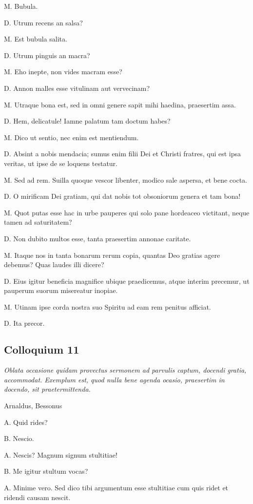 \documentclass{article}
\begin{document}
M. Bubula. 

D. Utrum recens an salsa?

M. Est bubula salita. 

D. Utrum pinguis an macra?

M. Eho inepte, non vides macram esse?

D. Annon malles esse vitulinam aut vervecinam?

M. Utraque bona est, sed in omni genere sapit mihi haedina, praesertim assa. 

D. Hem, delicatule! Iamne palatum tam doctum habes?

M. Dico ut sentio, nec enim est mentiendum. 

D. Absint a nobis mendacia; sumus enim filii Dei et Christi fratres, qui est ipsa veritas, ut ipse de se loquens testatur. 

M. Sed ad rem. Suilla quoque vescor libenter, modico sale aspersa, et bene cocta. 

D. O mirificam Dei gratiam, qui dat nobis tot obsoniorum genera et tam bona!

M. Quot putas esse hac in urbe pauperes qui solo pane hordeaceo victitant, neque tamen ad saturitatem?

D. Non dubito multos esse, tanta praesertim annonae caritate. 

M. Itaque nos in tanta bonarum rerum copia, quantas Deo gratias agere debemus? Quas laudes illi dicere?

D. Eius igitur beneficia magnifice ubique praedicemus, atque interim precemur, ut pauperum suorum misereatur inopiae. 

M. Utinam ipse corda nostra suo Spiritu ad eam rem penitus afficiat. 

D. Ita precor.

\subsection{Colloquium 11}
\emph{Oblata occasione quidam provectus sermonem ad parvulis captum, docendi gratia, accommodat. Exemplum est, quod nulla bene agenda ocasio, praesertim in docendo, sit praetermittenda.}

Arnaldus, Bessonus

A. Quid rides?

B. Nescio.

A. Nescis? Magnum signum stultitiae!

B. Me igitur stultum vocas?

A. Minime vero. Sed dico tibi argumentum esse stultitiae cum quis ridet et ridendi causam nescit. 
\end{document}
